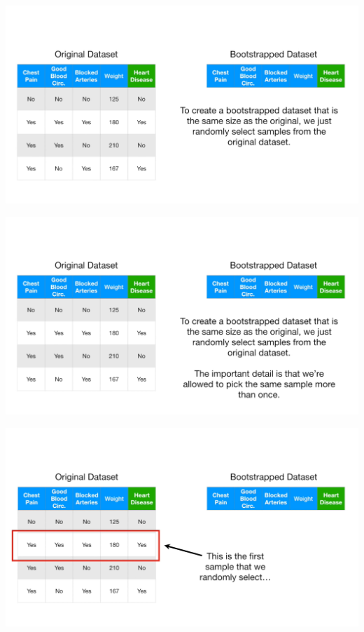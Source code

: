 \documentclass[
  ignorenonframetext,
]{beamer}
\begin{document}
\begin{frame}{}
\protect\hypertarget{section-11}{}
\includegraphics{images/r12.png}
\end{frame}

\begin{frame}{}
\protect\hypertarget{section-12}{}
\includegraphics{images/r13.png}
\end{frame}

\begin{frame}{}
\protect\hypertarget{section-13}{}
\includegraphics{images/r14.png}
\end{frame}
\end{document}
